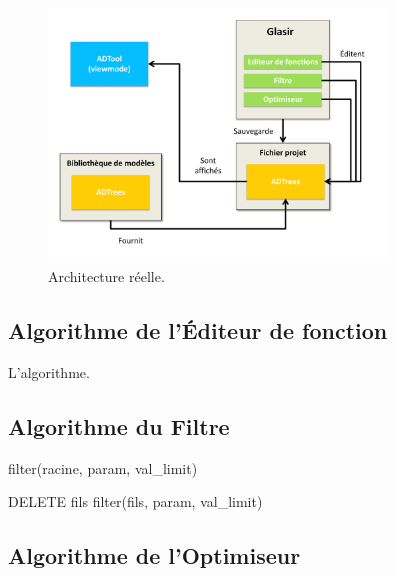         
        \begin{figure}[H]
            \centering
                \includegraphics[width=0.8\textwidth]{figure/archiReelle.pdf}
            \caption{Architecture réelle.}
            \label{fig:archiReelle}
        \end{figure}
        
        
\subsection{Algorithme de l'Éditeur de fonction}
	L'algorithme.


\subsection{Algorithme du Filtre}

 	\begin{algorithm}[h!]
            \caption{filter(racine, param, val\_limit)}
            \label{algo:opti}
            \begin{algorithmic}
	\STATE
                \STATE
	         \STATE DELETE fils
                    \RETURN
\STATE
	\ELSE
                \RETURN filter(fils, param, val\_limit)
\ENDIF
\ENDFOR
            \end{algorithmic}
        \end{algorithm}

\subsection{Algorithme de l'Optimiseur}


